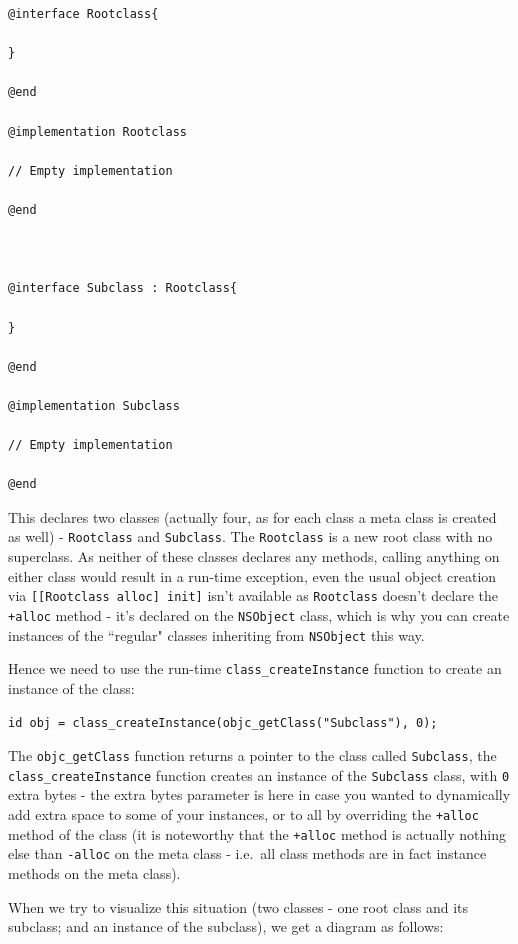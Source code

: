 \begin{verbatim}@interface Rootclass{
  
}

@end

@implementation Rootclass

// Empty implementation

@end



@interface Subclass : Rootclass{

}

@end

@implementation Subclass

// Empty implementation

@end 
\end{verbatim}

This declares two classes (actually four, as for each class a meta class is created as well) - \verb=Rootclass= and \verb=Subclass=. The \verb=Rootclass= is a new root class with no superclass. As neither of these classes declares any methods, calling anything on either class would result in a run-time exception, even the usual object creation via \verb=[[Rootclass alloc] init]= isn't available as \verb=Rootclass= doesn't declare the \verb=+alloc= method - it's declared on the \verb=NSObject= class, which is why you can create instances of the ``regular" classes inheriting from \verb=NSObject= this way.

Hence we need to use the run-time \verb=class_createInstance= function to create an instance of the class:

\begin{verbatim}
id obj = class_createInstance(objc_getClass("Subclass"), 0);
\end{verbatim}

The \verb=objc_getClass= function returns a pointer to the class called \verb=Subclass=, the \verb=class_createInstance= function creates an instance of the \verb=Subclass= class, with \verb=0= extra bytes - the extra bytes parameter is here in case you wanted to dynamically add extra space to some of your instances, or to all by overriding the \verb=+alloc= method of the class (it is noteworthy that the \verb=+alloc= method is actually nothing else than \verb=-alloc= on the meta class - i.e.\ all class methods are in fact instance methods on the meta class).


When we try to visualize this situation (two classes - one root class and its subclass; and an instance of the subclass), we get a diagram as follows:

